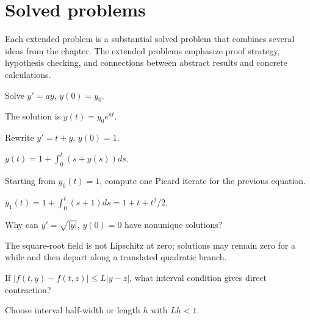 \section{Solved problems}
Each extended problem is a substantial solved problem that combines several ideas from the chapter. The extended problems emphasize proof strategy, hypothesis checking, and connections between abstract results and concrete calculations.

\begin{problem}\label{prob:ii19-problem-01}
Solve $y'=ay$, $y(0)=y_0$.
\end{problem}
\begin{solution}
The solution is $y(t)=y_0e^{at}$.
\end{solution}

\begin{problem}\label{prob:ii19-problem-02}
Rewrite $y'=t+y$, $y(0)=1$.
\end{problem}
\begin{solution}
$y(t)=1+\int_0^t(s+y(s))ds$.
\end{solution}

\begin{problem}\label{prob:ii19-problem-03}
Starting from $y_0(t)=1$, compute one Picard iterate for the previous equation.
\end{problem}
\begin{solution}
$y_1(t)=1+\int_0^t(s+1)ds=1+t+t^2/2$.
\end{solution}

\begin{problem}\label{prob:ii19-problem-04}
Why can $y'=\sqrt{|y|}$, $y(0)=0$ have nonunique solutions?
\end{problem}
\begin{solution}
The square-root field is not Lipschitz at zero; solutions may remain zero for a while and then depart along a translated quadratic branch.
\end{solution}

\begin{problem}\label{prob:ii19-problem-05}
If $|f(t,y)-f(t,z)|\le L|y-z|$, what interval condition gives direct contraction?
\end{problem}
\begin{solution}
Choose interval half-width or length $h$ with $Lh<1$.
\end{solution}

